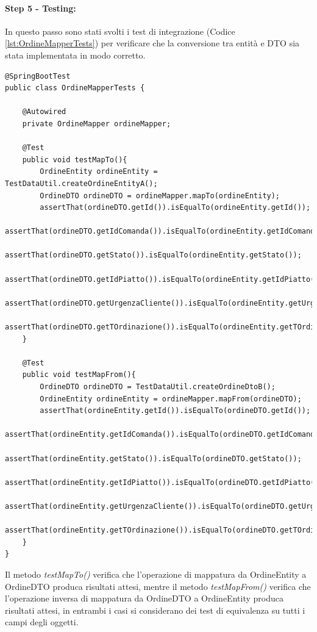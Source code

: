 \paragraph{Step 5 - Testing:}
In questo passo sono stati svolti i test di integrazione (Codice \vref{lst:OrdineMapperTests}) per verificare che la conversione tra entità e DTO sia stata implementata in modo corretto.
\begin{lstlisting}[style=myJava, 
    caption={Test di integrazione OrdineMapperTests.java}, label=lst:OrdineMapperTests, 
    emph={[2] ordineMapper},
    emphstyle={[2]\color{codeDarkMagenta}},
    emph={[3] testMapTo, testMapFrom },
    emphstyle={[3]\color{codeCyan}},]
@SpringBootTest
public class OrdineMapperTests {

    @Autowired
    private OrdineMapper ordineMapper;

    @Test
    public void testMapTo(){
        OrdineEntity ordineEntity = TestDataUtil.createOrdineEntityA();
        OrdineDTO ordineDTO = ordineMapper.mapTo(ordineEntity);
        assertThat(ordineDTO.getId()).isEqualTo(ordineEntity.getId());
        assertThat(ordineDTO.getIdComanda()).isEqualTo(ordineEntity.getIdComanda());
        assertThat(ordineDTO.getStato()).isEqualTo(ordineEntity.getStato());
        assertThat(ordineDTO.getIdPiatto()).isEqualTo(ordineEntity.getIdPiatto());
        assertThat(ordineDTO.getUrgenzaCliente()).isEqualTo(ordineEntity.getUrgenzaCliente());
        assertThat(ordineDTO.getTOrdinazione()).isEqualTo(ordineEntity.getTOrdinazione());
    }

    @Test
    public void testMapFrom(){
        OrdineDTO ordineDTO = TestDataUtil.createOrdineDtoB();
        OrdineEntity ordineEntity = ordineMapper.mapFrom(ordineDTO);
        assertThat(ordineEntity.getId()).isEqualTo(ordineDTO.getId());
        assertThat(ordineEntity.getIdComanda()).isEqualTo(ordineDTO.getIdComanda());
        assertThat(ordineEntity.getStato()).isEqualTo(ordineDTO.getStato());
        assertThat(ordineEntity.getIdPiatto()).isEqualTo(ordineDTO.getIdPiatto());
        assertThat(ordineEntity.getUrgenzaCliente()).isEqualTo(ordineDTO.getUrgenzaCliente());
        assertThat(ordineEntity.getTOrdinazione()).isEqualTo(ordineDTO.getTOrdinazione());
    }
}
\end{lstlisting}
Il metodo \textit{testMapTo()} verifica che l'operazione di mappatura da OrdineEntity a OrdineDTO produca risultati attesi, mentre il metodo \textit{testMapFrom()} verifica che l'operazione inversa di mappatura da OrdineDTO a OrdineEntity produca risultati attesi, in entrambi i casi si considerano dei test di equivalenza su tutti i campi degli oggetti.
